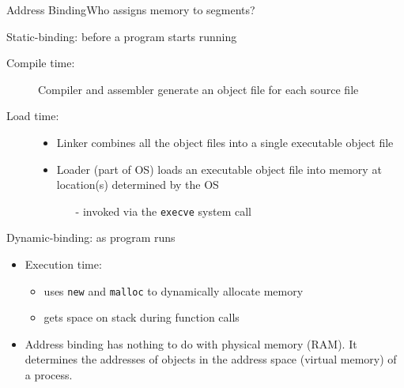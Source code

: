 \begin{frame}{Address Binding}{Who assigns memory to segments?}
  \begin{iblock}{Static-binding: before a program starts running}
    \begin{description}
    \item[Compile time:] \alert{Compiler} and \alert{assembler} generate an object file for
      each source file
    \item[Load time:] \hfill
      \begin{itemize}
      \item \alert{Linker} combines all the object files into a single executable object
        file
      \item \alert{Loader} (part of OS) loads an executable object file into
        memory at location(s) determined by the OS
        \begin{itemize}
        \item[-] invoked via the \texttt{execve} system call
        \end{itemize}
      \end{itemize}
    \end{description}
  \end{iblock}
  \begin{iblock}{Dynamic-binding: as program runs}
    \begin{itemize}
    \item Execution time:
      \begin{itemize}
      \item uses \texttt{new} and \texttt{malloc} to dynamically allocate memory
      \item gets space on stack during function calls
      \end{itemize}
    \end{itemize}
  \end{iblock}
\end{frame}

\begin{itemize}
\item Address binding has nothing to do with physical memory (RAM). It determines the
  addresses of objects in the address space (virtual memory) of a process.
\end{itemize}

